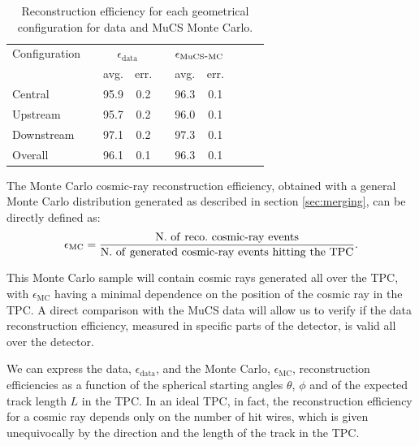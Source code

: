 \documentclass[a4paper]{scrartcl}
\def\myhyphen{{\hbox{-}}}
\begin{document}
\begin{table}[htbp]
  \centering
  \begin{tabular}{lccccccccc}
    \toprule
    Configuration & \phantom{a} & \multicolumn{2}{c}{$\epsilon_{\mathrm{data}}$} & \phantom{a} & \multicolumn{2}{c}{$\epsilon_{\mathrm{MuCS\myhyphen MC}}$} \\
     \cmidrule{3-4} \cmidrule{6-7}
      &  & avg. & err. & & avg. & err.  \\
    \midrule
    Central & & 95.9 & 0.2 & & 96.3 & 0.1 \\
    Upstream & & 95.7 & 0.2 & & 96.0 & 0.1 \\
    Downstream & & 97.1 & 0.2 & & 97.3 & 0.1 \\
    \midrule
    Overall & & 96.1 & 0.1 & & 96.3 & 0.1 \\
    \bottomrule
  \end{tabular}
  \caption{Reconstruction efficiency for each geometrical configuration for data and MuCS Monte Carlo.}\label{tab:config}
\end{table}


The Monte Carlo cosmic-ray reconstruction efficiency, obtained with a general Monte Carlo distribution generated as described in section \ref{sec:merging}, can be directly defined as:
\begin{equation}
  \epsilon_{\mathrm{MC}} = \frac{\mathrm{N.~of~reco.~cosmic\myhyphen ray~events}}{\mathrm{N.~of~generated~cosmic\myhyphen ray~events~hitting~the~TPC}}.
\end{equation}

This Monte Carlo sample will contain cosmic rays generated all over the TPC, with $\epsilon_{\mathrm{MC}}$ having a minimal dependence on the position of the cosmic ray in the TPC. A direct comparison with the MuCS data will allow us to verify if the data reconstruction efficiency, measured in specific parts of the detector, is valid all over the detector.

We can express the data, $\epsilon_{\mathrm{data}}$, and the Monte Carlo, $\epsilon_{\mathrm{MC}}$, reconstruction efficiencies as a function of the spherical starting angles $\theta$, $\phi$ and of the expected track length $L$ in the TPC. In an ideal TPC, in fact, the reconstruction efficiency for a cosmic ray depends only on the number of hit wires, which is given unequivocally by the direction and the length of the track in the TPC.
\end{document}
